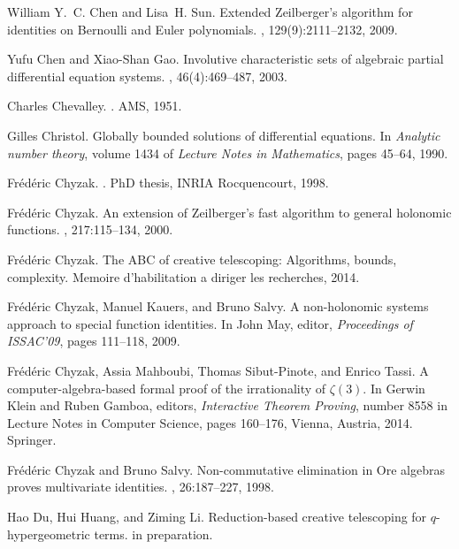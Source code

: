 \documentclass{jssc}
\begin{document}
\begin{thebibliography}{199}
William Y.~C. Chen and Lisa~H. Sun.
\newblock Extended {Z}eilberger's algorithm for identities on {B}ernoulli and
  {E}uler polynomials.
, 129(9):2111--2132, 2009.

Yufu Chen and Xiao-Shan Gao.
\newblock Involutive characteristic sets of algebraic partial differential
  equation systems.
, 46(4):469--487, 2003.

Charles Chevalley.
.
\newblock AMS, 1951.

Gilles Christol.
\newblock Globally bounded solutions of differential equations.
\newblock In {\em Analytic number theory}, volume 1434 of {\em Lecture Notes in
  Mathematics}, pages 45--64, 1990.

Fr{\'e}d{\'e}ric Chyzak.
.
\newblock PhD thesis, INRIA Rocquencourt, 1998.

Fr{\'e}d{\'e}ric Chyzak.
\newblock An extension of {Z}eilberger's fast algorithm to general holonomic
  functions.
, 217:115--134, 2000.

Fr{\'e}d{\'e}ric Chyzak.
\newblock The {ABC} of creative telescoping: Algorithms, bounds, complexity.
\newblock Memoire d'habilitation a diriger les recherches, 2014.

Fr{\'e}d{\'e}ric Chyzak, Manuel Kauers, and Bruno Salvy.
\newblock A non-holonomic systems approach to special function identities.
\newblock In John May, editor, {\em Proceedings of ISSAC'09}, pages 111--118,
  2009.

Fr{\'e}d{\'e}ric Chyzak, Assia Mahboubi, Thomas Sibut-Pinote, and Enrico Tassi.
\newblock A computer-algebra-based formal proof of the irrationality of
  $\zeta(3)$.
\newblock In Gerwin Klein and Ruben Gamboa, editors, {\em Interactive Theorem
  Proving}, number 8558 in Lecture Notes in Computer Science, pages 160--176,
  Vienna, Austria, 2014. Springer.

Fr{\'e}d{\'e}ric Chyzak and Bruno Salvy.
\newblock Non-commutative elimination in {O}re algebras proves multivariate
  identities.
, 26:187--227, 1998.

Hao Du, Hui Huang, and Ziming Li.
\newblock Reduction-based creative telescoping for $q$-hypergeometric terms.
\newblock in preparation.


\end{thebibliography}
\end{document}
